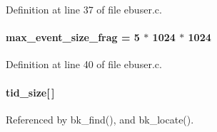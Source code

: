 Definition at line 37 of file ebuser.c.
\paragraph[{max\_\-event\_\-size\_\-frag}]{ {\bf max\_\-event\_\-size\_\-frag} = 5 $\ast$ 1024 $\ast$ 1024}\hfill\label{ebuser_8c_a5593758d19398ebc7c3d58d7f05ec160}


Definition at line 40 of file ebuser.c.
\paragraph[{tid\_\-size}]{ {\bf tid\_\-size}\mbox{[}$\,$\mbox{]}}\hfill\label{ebuser_8c_a97cc1898bd6240261b5418bcab5a6d35}


Referenced by bk\_\-find(), and bk\_\-locate().